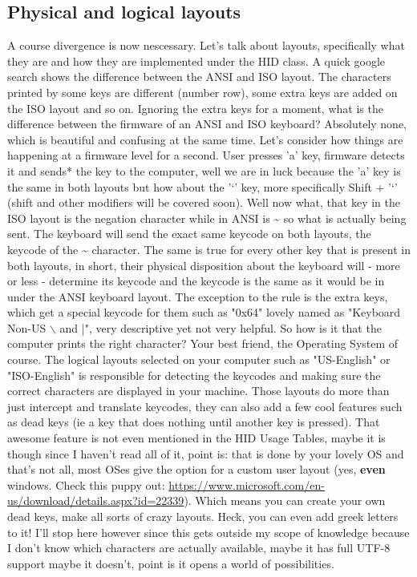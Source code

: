\documentclass[11pt]{article}
\begin{document}
\subsection{Physical and logical layouts}
\label{sec:orgbac6d1e}
A course divergence is now nescessary. Let's talk about layouts, specifically what they are and how they are implemented under the HID class. A quick google search shows the difference between the ANSI and ISO layout. The characters printed by some keys are different (number row), some extra keys are added on the ISO layout and so on. Ignoring the extra keys for a moment, what is the difference between the firmware of an ANSI and ISO keyboard? Absolutely none, which is beautiful and confusing at the same time. Let's consider how things are happening at a firmware level for a second. User presses 'a' key, firmware detects it and sends* the key to the computer, well we are in luck because the 'a' key is the same in both layouts but how about the '`' key, more specifically Shift + '`' (shift and other modifiers will be covered soon). Well now what, that key in the ISO layout is the negation character while in ANSI is \textasciitilde{} so what is actually being sent. The keyboard will send the exact same keycode on both layouts, the keycode of the \textasciitilde{} character. The same is true for every other key that is present in both layouts, in short, their physical disposition about the keyboard will - more or less - determine its keycode and the keycode is the same as it would be in under the ANSI keyboard layout. The exception to the rule is the extra keys, which get a special keycode for them such as "0x64" lovely named as "Keyboard Non-US $\backslash$ and |", very descriptive yet not very helpful. So how is it that the computer prints the right character? Your best friend, the Operating System of course. The logical layouts selected on your computer such as "US-English" or "ISO-English" is responsible for detecting the keycodes and making sure the correct characters are displayed in your machine. Those layouts do more than just intercept and translate keycodes, they can also add a few cool features such as dead keys (ie a key that does nothing until another key is pressed). That awesome feature is not even mentioned in the HID Usage Tables, maybe it is though since I haven't read all of it, point is: that is done by your lovely OS and that's not all, most OSes give the option for a custom user layout (yes, \textbf{even} windows. Check this puppy out: \url{https://www.microsoft.com/en-us/download/details.aspx?id=22339}). Which means you can create your own dead keys, make all sorts of crazy layouts. Heck, you can even add greek letters to it! I'll stop here however since this gets outside my scope of knowledge because I don't know which characters are actually available, maybe it has full UTF-8 support maybe it doesn't, point is it opens a world of possibilities. 
\end{document}
